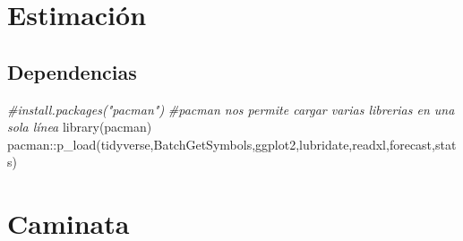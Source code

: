\documentclass[
]{book}
\newenvironment{Shaded}{\begin{snugshade}}{\end{snugshade}}
\newcommand{\CommentTok}[1]{\textcolor[rgb]{0.56,0.35,0.01}{\textit{#1}}}
\newcommand{\FunctionTok}[1]{\textcolor[rgb]{0.00,0.00,0.00}{#1}}
\newcommand{\NormalTok}[1]{#1}
\newcommand{\SpecialCharTok}[1]{\textcolor[rgb]{0.00,0.00,0.00}{#1}}
\begin{document}
\hypertarget{estimaciuxf3n-1}{%
\section{Estimación}\label{estimaciuxf3n-1}}

\hypertarget{dependencias-2}{%
\subsection{Dependencias}\label{dependencias-2}}

\begin{Shaded}
\begin{Highlighting}[]
\CommentTok{\#install.packages("pacman")}
\CommentTok{\#pacman nos permite cargar varias librerias en una sola línea}
\FunctionTok{library}\NormalTok{(pacman)}
\NormalTok{pacman}\SpecialCharTok{::}\FunctionTok{p\_load}\NormalTok{(tidyverse,BatchGetSymbols,ggplot2,lubridate,readxl,forecast,stats)}
\end{Highlighting}
\end{Shaded}

\hypertarget{caminata}{%
\section{Caminata}\label{caminata}}
\end{document}
